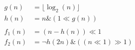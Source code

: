 \documentclass[border=3pt]{standalone}
\def\BitAnd{\mathbin{\&}}
\def\ShiftLeft{\ll}
\def\ShiftRight{\gg}
\def\BitNeg{\ensuremath{\mathord{\lnot}}}  %
\begin{document}
$ \displaystyle
    \begin{aligned} 
        g(n) &= \lfloor\log_2(n)\rfloor\\
        h(n) &= n \BitAnd (1 \ShiftLeft g(n))\\\\
        f_1(n) &= (n - h(n)) \ShiftLeft 1\\
        f_2(n) &= \BitNeg h(2n) \BitAnd ((n \ShiftLeft 1) \ShiftRight 1)\\%
    \end{aligned}
$
\end{document}
